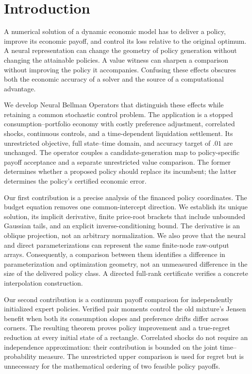 \section{Introduction}\label{sec:r23intro}
A numerical solution of a dynamic economic model has to deliver a policy, improve its economic payoff, and control its loss relative to the original optimum. A neural representation can change the geometry of policy generation without changing the attainable policies. A value witness can sharpen a comparison without improving the policy it accompanies. Confusing these effects obscures both the economic accuracy of a solver and the source of a computational advantage.

We develop Neural Bellman Operators that distinguish these effects while retaining a common stochastic control problem. The application is a stopped consumption--portfolio economy with costly preference adjustment, correlated shocks, continuous controls, and a time-dependent liquidation settlement. Its unrestricted objective, full state--time domain, and accuracy target of $.01$ are unchanged. The operator couples a candidate-generation map to policy-specific payoff acceptance and a separate unrestricted value comparison. The former determines whether a proposed policy should replace its incumbent; the latter determines the policy's certified economic error.

Our first contribution is a precise analysis of the financed policy coordinates. The budget equation removes one common-intercept direction. We establish its unique solution, its implicit derivative, finite price-root brackets that include unbounded Gaussian tails, and an explicit inverse-conditioning bound. The derivative is an oblique projection, not an arbitrary normalization. We also prove that the neural and direct parameterizations can represent the same finite-node raw-output arrays. Consequently, a comparison between them identifies a difference in parameterization and optimization geometry, not an unmeasured difference in the size of the delivered policy class. A directed full-rank certificate verifies a concrete interpolation construction.

Our second contribution is a continuum payoff comparison for independently initialized expert policies. Verified pair moments control the old mixture's Jensen benefit when both its consumption slopes and preference drifts differ across corners. The resulting theorem proves policy improvement and a true-regret reduction at every initial state of a rectangle. Correlated shocks do not require an independence approximation: their contribution is bounded on the joint time--probability measure. The unrestricted upper comparison is used for regret but is unnecessary for the mathematical ordering of two feasible policy payoffs.

